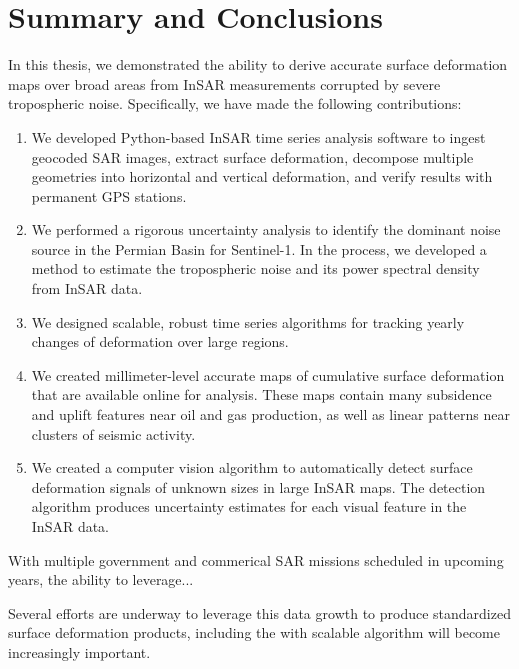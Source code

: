 
\chapter{Summary and Conclusions}
\label{CHAP:7}

In this thesis, we demonstrated the ability to derive accurate surface deformation maps over broad areas from InSAR measurements corrupted by severe tropospheric noise. Specifically, we have made the following contributions:



\begin{enumerate}
	
	\item We developed Python-based InSAR time series analysis software to ingest geocoded SAR images, extract surface deformation, decompose multiple geometries into horizontal and vertical deformation, and verify results with permanent GPS stations.
	
	\item We performed a rigorous uncertainty analysis to identify the dominant noise source in the Permian Basin for Sentinel-1.  In the process, we developed a method to estimate the tropospheric noise and its power spectral density from InSAR data.
	
	\item We designed scalable, robust time series algorithms for tracking yearly changes of deformation over large regions.
	
	\item We created millimeter-level accurate maps of cumulative surface deformation that are available online for analysis. These maps contain many subsidence and uplift features near oil and gas production, as well as linear patterns near clusters of seismic activity.
	
	\item We created a computer vision algorithm to automatically detect surface deformation signals of unknown sizes in large InSAR maps. The detection algorithm produces uncertainty estimates for each visual feature in the InSAR data.
	
		
\end{enumerate}

With multiple government and commerical SAR missions scheduled in upcoming years, the ability to leverage...

Several efforts are underway to leverage this data growth to produce standardized surface deformation products, including the 
with scalable algorithm will become increasingly important.  

